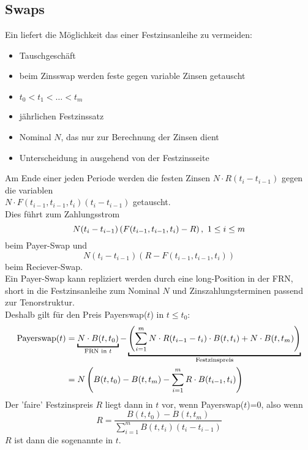 \subsection{Swaps}
\label{sub:swaps}
Ein  liefert die Möglichkeit das  einer Festzinsanleihe zu vermeiden:\\
\begin{itemize}
	\item Tauschgeschäft
	\item beim Zinsswap werden feste gegen variable Zinsen getauscht
	\item {} $t_0<t_1<\dots<t_m$
	\item jährlichen Festzinssatz
	\item Nominal $N$, das nur zur Berechnung der Zinsen dient
	\item Unterscheidung in   ausgehend von der Festzinsseite
\end{itemize}
Am Ende einer jeden Periode werden die festen Zinsen $N\cdot R(t_i-t_{i-1})$ gegen die variablen\\ 
$N\cdot F(t_{i-1},t_{i-1},t_i)(t_i-t_{i-1})$ getauscht.\\
Dies führt zum Zahlungsstrom
\[
N(t_i-t_{i-1})\left( F(t_{i-1},t_{i-1},t_i)-R\right),~1\le i\le m 
\]
beim Payer-Swap und
\[
N(t_i-t_{i-1})(R-F(t_{i-1},t_{i-1},t_i)) 
\]
beim Reciever-Swap.\\
Ein Payer-Swap kann repliziert werden durch eine long-Position in der FRN, short in die Festzinsanleihe zum Nominal $N$ und Zinszahlungsterminen passend zur Tenorstruktur.\\
Deshalb gilt für den Preis Payerswap($t$) in $t\le t_0$:\\
\begin{equation*}
\begin{aligned}
	\text{Payerswap}(t) &= \underbracket{N\cdot B(t,t_0)}_{\text{FRN in }t}-\underbracket{\enbrace{\sum_{i=1}^{m}N\cdot R(t_{i-1}-t_i) \cdot B(t,t_i)+N\cdot B(t,t_m)}}_{\text{Festzinspreis}}\\
	&=N\enbrace{B(t,t_0)-B(t,t_m)-\sum_{i=1}^{m}R\cdot B(t_{i-1},t_i)}
\end{aligned}
\end{equation*}
Der 'faire' Festzinspreis $R$ liegt dann in $t$ vor, wenn Payerswap($t$)=0, also wenn
\[
R= \frac{B(t,t_0)-B(t,t_m)}{\sum_{i=1}^{m}B(t,t_i)(t_i-t_{i-1})} 
\]
$R$ ist dann die sogenannte  in $t$.

